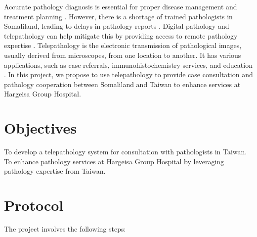 \documentclass{article}
\begin{document}
Accurate pathology diagnosis is essential for proper disease management and treatment planning \cite{bauer2019}. However, there is a shortage of trained pathologists in Somaliland, leading to delays in pathology reports \cite{omar2022telepathology}. Digital pathology and telepathology can help mitigate this by providing access to remote pathology expertise \cite{horton2021}. 
Telepathology is the electronic transmission of pathological images, usually derived from microscopes, from one location to another. It has various applications, such as case referrals, immunohistochemistry services, and education \cite{horton2021}.
In this project, we propose to use telepathology to provide case consultation and pathology cooperation between Somaliland and Taiwan to enhance services at Hargeisa Group Hospital.

\section{Objectives}
\begin{outline}
\1 To develop a telepathology system for consultation with pathologists in Taiwan.
\1 To enhance pathology services at Hargeisa Group Hospital by leveraging pathology expertise from Taiwan.
\end{outline}

\section{Protocol}

The project involves the following steps:
\end{document}
